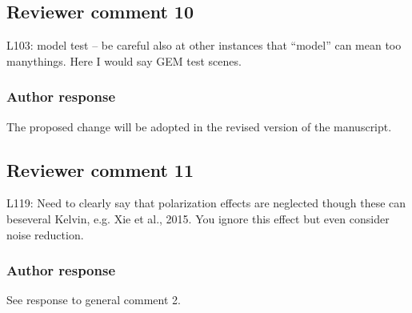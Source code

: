 \documentclass[11pt]{scrartcl}
\begin{document}
\subsection*{Reviewer comment 10}
L103: model test – be careful also at other instances that “model” can mean too manythings. Here I would say GEM test scenes.

\subsubsection*{Author response}

The proposed change will be adopted in the revised version of the manuscript.

%


\subsection*{Reviewer comment 11}

L119: Need to clearly say that polarization effects are neglected though these can beseveral Kelvin, e.g.  Xie et al., 2015.  You ignore this effect but even consider noise reduction.


\subsubsection*{Author response}

See response to general comment 2. 
\end{document}
